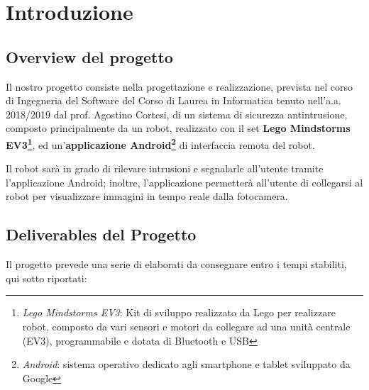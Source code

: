 \documentclass{article}
\begin{document}
\pagebreak

\section{Introduzione}

\subsection{Overview del progetto}

Il nostro progetto consiste nella progettazione e realizzazione, prevista nel corso di Ingegneria del Software del Corso di Laurea in Informatica tenuto nell'a.a. 2018/2019 dal prof. Agostino Cortesi, di un sistema di sicurezza antintrusione, composto principalmente da un robot, realizzato con il set \textbf{Lego Mindstorms EV3\footnote{\emph{Lego Mindstorms EV3}: Kit di
sviluppo realizzato da Lego per realizzare robot, composto da vari
sensori e motori da collegare ad una unità centrale (EV3),
programmabile e dotata di Bluetooth e USB}}, ed un'\textbf{applicazione Android\footnote{\emph{Android}: sistema
operativo dedicato agli smartphone e tablet sviluppato da Google}} di interfaccia remota del robot.

Il robot sarà in grado di rilevare intrusioni e segnalarle all'utente tramite l'applicazione Android; inoltre, l'applicazione permetterà all'utente di collegarsi al robot per visualizzare immagini in tempo reale dalla fotocamera.

\subsection{Deliverables del Progetto}

Il progetto prevede una serie di elaborati da consegnare entro i tempi stabiliti, qui sotto riportati:
\end{document}
